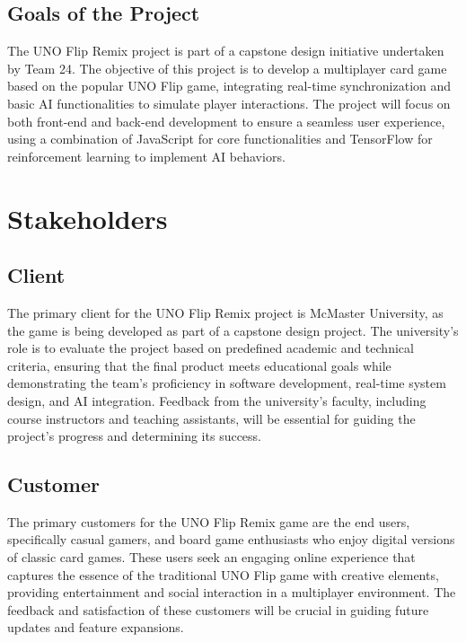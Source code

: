 \documentclass{article}
\begin{document}
\subsection{Goals of the Project}
The UNO Flip Remix project is part of a capstone design initiative undertaken by Team 24. The objective of this project is to develop a multiplayer card game based on the popular UNO Flip game, integrating real-time synchronization and basic AI functionalities to simulate player interactions. The project will focus on both front-end and back-end development to ensure a seamless user experience, using a combination of JavaScript for core functionalities and TensorFlow for reinforcement learning to implement AI behaviors.

\section{Stakeholders}

\subsection{Client}
The primary client for the UNO Flip Remix project is McMaster University, as the game is being developed as part of a capstone design project. The university's role is to evaluate the project based on predefined academic and technical criteria, ensuring that the final product meets educational goals while demonstrating the team's proficiency in software development, real-time system design, and AI integration. Feedback from the university's faculty, including course instructors and teaching assistants, will be essential for guiding the project's progress and determining its success.

\subsection{Customer}
The primary customers for the UNO Flip Remix game are the end users, specifically casual gamers, and board game enthusiasts who enjoy digital versions of classic card games. These users seek an engaging online experience that captures the essence of the traditional UNO Flip game with creative elements, providing entertainment and social interaction in a multiplayer environment. The feedback and satisfaction of these customers will be crucial in guiding future updates and feature expansions.

\end{document}
